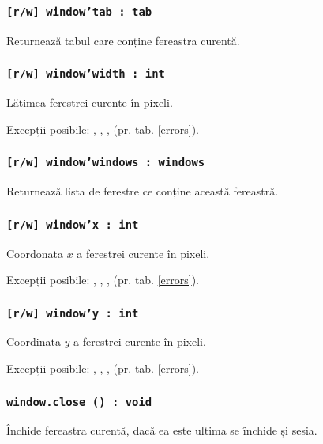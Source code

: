 \subsubsection{\texttt{[r/w] window'tab : tab}}

Returnează tabul care conține fereastra curentă.

\subsubsection{\texttt{[r/w] window'width : int}}

Lățimea ferestrei curente în pixeli.

Excepții posibile: , , ,  (pr. tab. \ref{errors}).

\subsubsection{\texttt{[r/w] window'windows : windows}}

Returnează lista de ferestre ce conține această fereastră.

\subsubsection{\texttt{[r/w] window'x : int}}

Coordonata $x$ a ferestrei curente în pixeli.

Excepții posibile: , , ,  (pr. tab. \ref{errors}).

\subsubsection{\texttt{[r/w] window'y : int}}

Coordinata $y$ a ferestrei curente în pixeli.

Excepții posibile: , , ,  (pr. tab. \ref{errors}).

\subsubsection{\texttt{window.close () : void}}

Închide fereastra curentă, dacă ea este ultima se închide și sesia.

